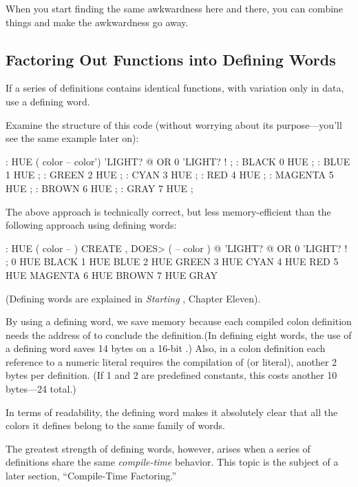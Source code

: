 When you start finding the same awkwardness here and there, you can
combine things and make the awkwardness go away.

\subsection{Factoring Out Functions into Defining Words}

\begin{tip}
If a series of definitions contains identical functions, with
variation only in data, use a defining word.
\end{tip}
Examine the structure of this code (without worrying about its
purpose---you'll see the same example later on):

\begin{Code}
: HUE  ( color -- color') 
   'LIGHT? @  OR  0 'LIGHT? ! ;
: BLACK   0 HUE ;
: BLUE   1 HUE ;
: GREEN   2 HUE ;
: CYAN   3 HUE ;
: RED   4 HUE ;
: MAGENTA   5 HUE ;
: BROWN   6 HUE ;
: GRAY   7 HUE ;
\end{Code}

\noindent The above approach is technically correct, but less
memory-efficient than the following approach using defining words:

\begin{Code}
: HUE   ( color -- )  CREATE ,
   DOES>  ( -- color )  @ 'LIGHT? @  OR  0 'LIGHT? ! ;
 0 HUE BLACK         1 HUE BLUE          2 HUE GREEN
 3 HUE CYAN          4 HUE RED           5 HUE MAGENTA
 6 HUE BROWN         7 HUE GRAY
\end{Code}
(Defining words are explained in \emph{Starting \Forth{}}, Chapter Eleven).

By using a defining word, we save memory because each compiled colon
definition needs the address of  to conclude the
definition.(In defining eight words, the use of a defining word saves
14 bytes on a 16-bit \Forth{}.) Also, in a colon definition each
reference to a numeric literal requires the compilation of
 (or literal), another 2 bytes per definition. (If 1 and 2
are predefined constants, this costs another 10 bytes---24 total.)

In terms of readability, the defining word makes it absolutely clear
that all the colors it defines belong to the same family of words.

The greatest strength of defining words, however, arises when a series
of definitions share the same \emph{compile-time} behavior. This topic
is the subject of a later section, ``Compile-Time Factoring.''


